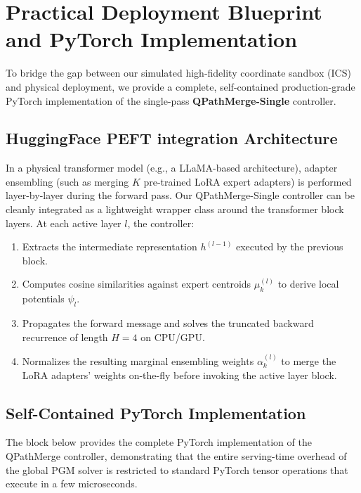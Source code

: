 \section{Practical Deployment Blueprint and PyTorch Implementation}
\label{sec:appendix_deployment}

To bridge the gap between our simulated high-fidelity coordinate sandbox (ICS) and physical deployment, we provide a complete, self-contained production-grade PyTorch implementation of the single-pass \textbf{QPathMerge-Single} controller. 

\subsection{HuggingFace PEFT integration Architecture}
In a physical transformer model (e.g., a LLaMA-based architecture), adapter ensembling (such as merging $K$ pre-trained LoRA expert adapters) is performed layer-by-layer during the forward pass. Our QPathMerge-Single controller can be cleanly integrated as a lightweight wrapper class around the transformer block layers. At each active layer $l$, the controller:
\begin{enumerate}
    \item Extracts the intermediate representation $h^{(l-1)}$ executed by the previous block.
    \item Computes cosine similarities against expert centroids $\mu_k^{(l)}$ to derive local potentials $\psi_l$.
    \item Propagates the forward message and solves the truncated backward recurrence of length $H=4$ on CPU/GPU.
    \item Normalizes the resulting marginal ensembling weights $\alpha_k^{(l)}$ to merge the LoRA adapters' weights on-the-fly before invoking the active layer block.
\end{enumerate}

\subsection{Self-Contained PyTorch Implementation}
The block below provides the complete PyTorch implementation of the QPathMerge controller, demonstrating that the entire serving-time overhead of the global PGM solver is restricted to standard PyTorch tensor operations that execute in a few microseconds.

